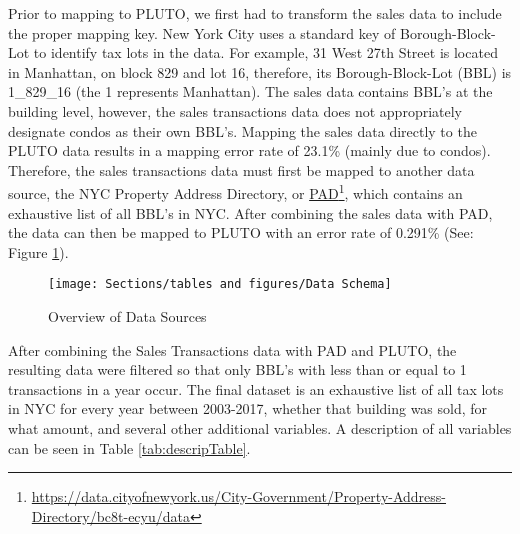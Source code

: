 \documentclass[12pt,]{article}
\let\rmarkdownfootnote\footnote%
\def\footnote{\protect\rmarkdownfootnote}
\begin{document}
Prior to mapping to PLUTO, we first had to transform the sales data to
include the proper mapping key. New York City uses a standard key of
Borough-Block-Lot to identify tax lots in the data. For example, 31 West
27th Street is located in Manhattan, on block 829 and lot 16, therefore,
its Borough-Block-Lot (BBL) is 1\_829\_16 (the 1 represents Manhattan).
The sales data contains BBL's at the building level, however, the sales
transactions data does not appropriately designate condos as their own
BBL's. Mapping the sales data directly to the PLUTO data results in a
mapping error rate of 23.1\% (mainly due to condos). Therefore, the
sales transactions data must first be mapped to another data source, the
NYC Property Address Directory, or
\href{https://data.cityofnewyork.us/City-Government/Property-Address-Directory/bc8t-ecyu/data}{PAD}\footnote{\url{https://data.cityofnewyork.us/City-Government/Property-Address-Directory/bc8t-ecyu/data}},
which contains an exhaustive list of all BBL's in NYC. After combining
the sales data with PAD, the data can then be mapped to PLUTO with an
error rate of 0.291\% (See: Figure \ref{fig:Data Schema}).

\begin{figure}[H]
\texttt{[image: Sections/tables and figures/Data Schema]} \caption{Overview of Data Sources}\label{fig:Data Schema}
\end{figure}

After combining the Sales Transactions data with PAD and PLUTO, the
resulting data were filtered so that only BBL's with less than or equal
to 1 transactions in a year occur. The final dataset is an exhaustive
list of all tax lots in NYC for every year between 2003-2017, whether
that building was sold, for what amount, and several other additional
variables. A description of all variables can be seen in Table
\ref{tab:descripTable}.
\end{document}
